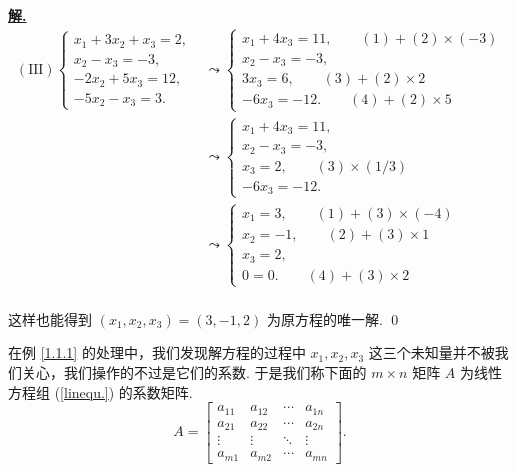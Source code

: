 \documentclass[10pt,openany]{article}
\theoremstyle{thmstyle} %
\theoremstyle{defstyle} %
\theoremstyle{prostyle} %
\newenvironment{solution}{\par\underline{\textbf{解.}} \;\fangsong}{\qed\par}
\begin{document}
\begin{solution}
	\begin{align*}
		(\text{III}) \left\{
		\begin{array}{l}
			x_1 + 3x_2 + x_3 = 2, \\
			x_2 - x_3 = -3, \\
			-2x_2 + 5x_3 = 12, \\
			-5x_2 - x_3 = 3.
		\end{array}
		\right. &\leadsto  \left\{
		\begin{array}{l}
			x_1 + 4x_3 = 11, \qquad (1)+(2) \times (-3)\\
			x_2 - x_3 = -3, \\
			3x_3 = 6, \qquad (3)+(2) \times 2 \\
			-6x_3 = -12. \qquad (4)+(2) \times 5 
		\end{array}
		\right. \\
		&\leadsto  \left\{
		\begin{array}{l}
			x_1 + 4x_3 = 11, \\
			x_2 - x_3 = -3, \\
			x_3 = 2, \qquad (3) \times (1/3) \\
			-6x_3 = -12. 
		\end{array}
		\right. \\
		&\leadsto  \left\{
		\begin{array}{l}
			x_1  = 3, \qquad (1)+(3) \times (-4)\\
			x_2  = -1, \qquad (2)+(3) \times 1 \\
			x_3 = 2,  \\
			0=0. \qquad (4)+(3) \times 2 
		\end{array}
		\right. \\
	\end{align*}
	
	这样也能得到 \( (x_1,x_2,x_3)=(3,-1,2) \) 为原方程的唯一解.
\end{solution}

在例 \ref{1.1.1} 的处理中，我们发现解方程的过程中 \( x_1,x_2,x_3 \) 这三个未知量并不被我们关心，我们操作的不过是它们的系数. 于是我们称下面的 \( m \times n \) 矩阵 \( A \) 为线性方程组 (\ref{linequ.}) 的系数矩阵.
\[ A=\begin{bmatrix}
	a_{11} & a_{12} & \cdots & a_{1n} \\
	a_{21} & a_{22} & \cdots & a_{2n} \\
	\vdots & \vdots & \ddots & \vdots \\
	a_{m1} & a_{m2} & \cdots & a_{mn}
\end{bmatrix}. \]
\end{document}
